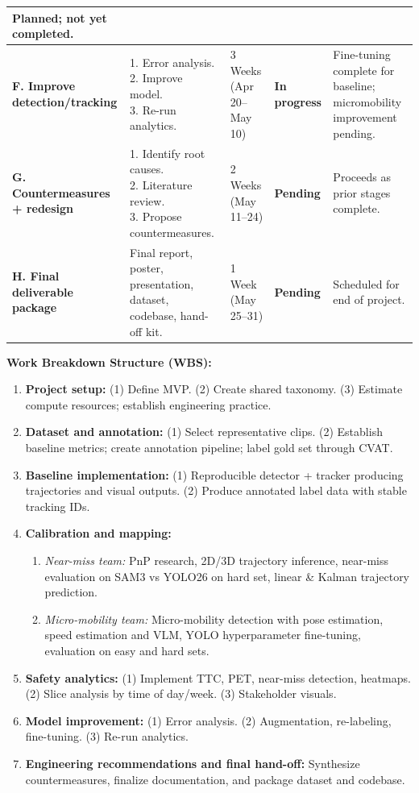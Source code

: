 \documentclass[12pt,letterpaper]{article}
\begin{document}
\begin{longtable}{|p{2.8cm}|p{3.5cm}|p{1.8cm}|p{1.5cm}|p{3cm}|}
Planned; not yet completed. \\
\hline
\textbf{F. Improve detection/tracking} &
\makecell[l]{1. Error analysis. \\ 2. Improve model. \\ 3. Re-run analytics.} &
3 Weeks \newline (Apr 20--May 10) & \textbf{In progress} &
Fine-tuning complete for baseline; micromobility improvement pending. \\
\hline
\textbf{G. Countermeasures + redesign} &
\makecell[l]{1. Identify root causes. \\ 2. Literature review. \\ 3. Propose countermeasures.} &
2 Weeks \newline (May 11--24) & \textbf{Pending} &
Proceeds as prior stages complete. \\
\hline
\textbf{H. Final deliverable package} &
Final report, poster, presentation, dataset, codebase, hand-off kit. &
1 Week \newline (May 25--31) & \textbf{Pending} &
Scheduled for end of project. \\
\hline
\end{longtable}

\textbf{Work Breakdown Structure (WBS):}
\begin{enumerate}
    \item \textbf{Project setup:} (1) Define MVP. (2) Create shared taxonomy. (3) Estimate compute resources; establish engineering practice.
    \item \textbf{Dataset and annotation:} (1) Select representative clips. (2) Establish baseline metrics; create annotation pipeline; label gold set through CVAT.
    \item \textbf{Baseline implementation:} (1) Reproducible detector + tracker producing trajectories and visual outputs. (2) Produce annotated label data with stable tracking IDs.
    \item \textbf{Calibration and mapping:}
    \begin{enumerate}
        \item \textit{Near-miss team:} PnP research, 2D/3D trajectory inference, near-miss evaluation on SAM3 vs YOLO26 on hard set, linear \& Kalman trajectory prediction.
        \item \textit{Micro-mobility team:} Micro-mobility detection with pose estimation, speed estimation and VLM, YOLO hyperparameter fine-tuning, evaluation on easy and hard sets.
    \end{enumerate}
    \item \textbf{Safety analytics:} (1) Implement TTC, PET, near-miss detection, heatmaps. (2) Slice analysis by time of day/week. (3) Stakeholder visuals.
    \item \textbf{Model improvement:} (1) Error analysis. (2) Augmentation, re-labeling, fine-tuning. (3) Re-run analytics.
    \item \textbf{Engineering recommendations and final hand-off:} Synthesize countermeasures, finalize documentation, and package dataset and codebase.
\end{enumerate}
\end{document}
